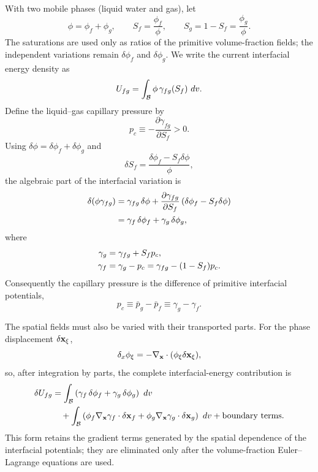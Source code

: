With two mobile phases (liquid water and gas), let
\[
  \phi = \phi_f+\phi_g,\qquad
  S_f=\frac{\phi_f}{\phi},\qquad
  S_g=1-S_f=\frac{\phi_g}{\phi}.
\]
The saturations are used only as ratios of the primitive volume-fraction fields;
the independent variations remain $\delta\phi_f$ and $\delta\phi_g$.  We write
the current interfacial energy density as
\[
  U_{fg}=\int_{\mathcal{B}}\phi\,\gamma_{fg}(S_f)\,\,dv .
\]
Define the liquid--gas capillary pressure by
\begin{equation}
  p_c \equiv -\frac{\partial\gamma_{fg}}{\partial S_f} > 0.
  \label{eq:pc_def}
\end{equation}
Using $\delta\phi=\delta\phi_f+\delta\phi_g$ and
\[
  \delta S_f=\frac{\delta\phi_f-S_f\delta\phi}{\phi},
\]
the algebraic part of the interfacial variation is
\begin{align}
  \delta\!\left(\phi\gamma_{fg}\right)
  &= \gamma_{fg}\,\delta\phi
     + \frac{\partial\gamma_{fg}}{\partial S_f}
       \left(\delta\phi_f-S_f\delta\phi\right) \notag\\
  &= \gamma_f\,\delta\phi_f+\gamma_g\,\delta\phi_g,
\end{align}
where
\begin{align}
  \gamma_g &= \gamma_{fg}+S_f p_c, \notag\\
  \gamma_f &= \gamma_g-p_c
            = \gamma_{fg}-(1-S_f)p_c .
  \label{eq:primitive_gamma_derivatives}
\end{align}
Consequently the capillary pressure is the difference of primitive interfacial
potentials,
\begin{equation}
  p_c \equiv \bar p_g-\bar p_f \equiv \gamma_g-\gamma_f .
  \label{eq:pc_gamma_difference}
\end{equation}

The spatial fields must also be varied with their transported parts.  For the
phase displacement $\delta\mathbf{x}_\xi$,
\[
  \delta_x\phi_\xi=-\nabla_{\mathbf{x}}\cdot(\phi_\xi\delta\mathbf{x}_\xi),
\]
so, after integration by parts, the complete interfacial-energy contribution is
\begin{align}
  \delta U_{fg}
  &= \int_{\mathcal{B}} \left(\gamma_f\,\delta\phi_f
      + \gamma_g\,\delta\phi_g\right) \,\,dv \notag \\
  &\quad + \int_{\mathcal{B}} \left(\phi_f\nabla_{\mathbf{x}}\gamma_f\cdot\delta\mathbf{x}_f
      + \phi_g\nabla_{\mathbf{x}}\gamma_g\cdot\delta\mathbf{x}_g\right) \,\,dv
  + \text{boundary terms}.
  \label{eq:deltaU_fg}
\end{align}
This form retains the gradient terms generated by the spatial dependence of the
interfacial potentials; they are eliminated only after the volume-fraction
Euler--Lagrange equations are used.

